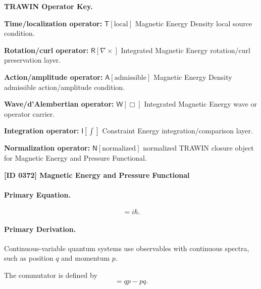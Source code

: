 \par\vspace{0.45\baselineskip}
\noindent\begin{minipage}[t]{\linewidth}
\begingroup
\small
\raggedright
\textbf{TRAWIN Operator Key.}\par
\noindent\textbf{Time/localization operator:} $\mathsf{T}\!\left[\mathrm{local}\right]$ Magnetic Energy Density local source condition.\par
\noindent\textbf{Rotation/curl operator:} $\mathsf{R}\!\left[\nabla\times\right]$ Integrated Magnetic Energy rotation/curl preservation layer.\par
\noindent\textbf{Action/amplitude operator:} $\mathsf{A}\!\left[\mathrm{admissible}\right]$ Magnetic Energy Density admissible action/amplitude condition.\par
\noindent\textbf{Wave/d'Alembertian operator:} $\mathsf{W}\!\left[\Box\right]$ Integrated Magnetic Energy wave or operator carrier.\par
\noindent\textbf{Integration operator:} $\mathsf{I}\!\left[\int\right]$ Constraint Energy integration/comparison layer.\par
\noindent\textbf{Normalization operator:} $\mathsf{N}\!\left[\mathrm{normalized}\right]$ normalized TRAWIN closure object for Magnetic Energy and Pressure Functional.\par
\endgroup
\end{minipage}

\clearpage
\noindent\textbf{[ID 0372] Magnetic Energy and Pressure Functional}\par
\vspace{0.35em}
\paragraph{Primary Equation.}
\begin{equation}
[q,p]=i\hbar .
\end{equation}

\paragraph{Primary Derivation.}
Continuous-variable quantum systems use observables with continuous spectra, such as position $q$ and momentum $p$.

The commutator is defined by
\begin{equation}
[q,p]=qp-pq .
\end{equation}

